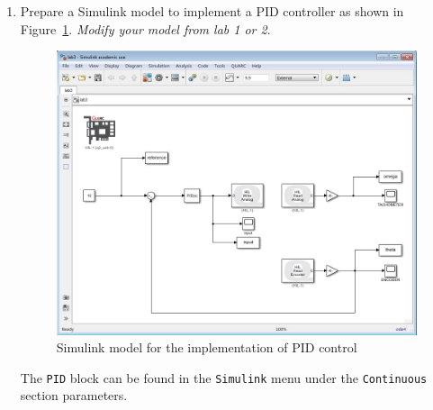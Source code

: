 \begin{enumerate}
\item Prepare a \textsf{Simulink} model to implement a PID controller as
shown in Figure~\ref{fig:model6}\@. \emph{Modify your model from lab 1 or 2}.
\begin{figure}[htbp]
\centering
\includegraphics[width=0.6\hsize]{pix/lab3.jpg}
\caption{\textsf{Simulink} model for the implementation of PID control}\label{fig:model6}
\end{figure}%
The \verb|PID| block can be found in the \verb|Simulink| menu under the
\verb|Continuous| section parameters.


\end{enumerate}
